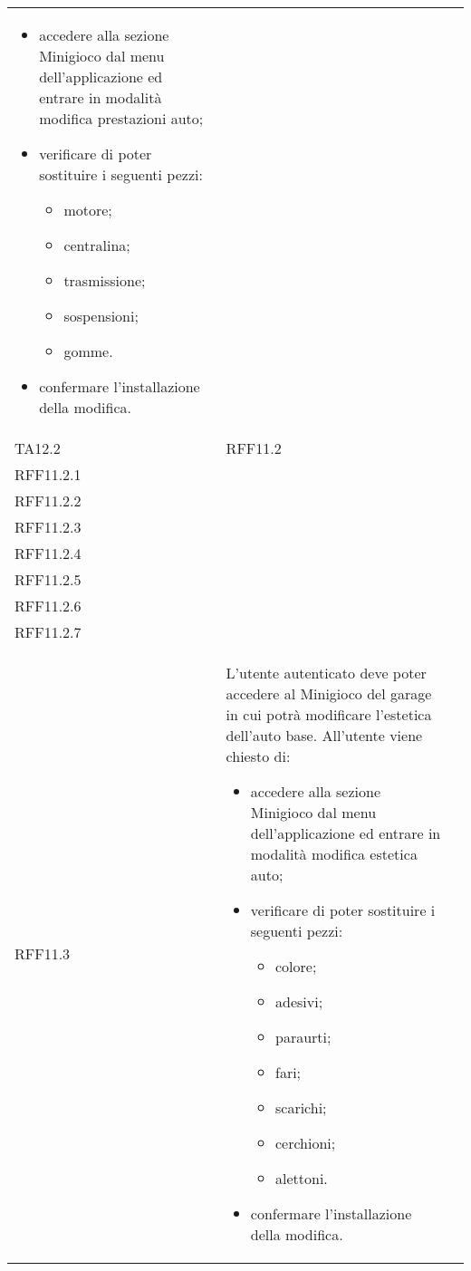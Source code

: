 \begin{longtable}{ >{\centering}p{} >{\centering}p{} >{\centering}p{}
			}
\begin{itemize}
		 	\item accedere alla sezione Minigioco dal menu dell'applicazione ed entrare in modalità modifica prestazioni auto;
		 	\item verificare di poter sostituire i seguenti pezzi:
		 		\begin{itemize}
		 			\item motore;
		 			\item centralina;
		 			\item trasmissione;
		 			\item sospensioni;
		 			\item gomme.
		 		\end{itemize}
		 	\item confermare l'installazione della modifica.
		 \end{itemize}		\tabularnewline
		 TA12.2	& RFF11.2\\ RFF11.2.1 \\ RFF11.2.2 \\ RFF11.2.3 \\ RFF11.2.4 \\ RFF11.2.5  \\ 	RFF11.2.6 \\ RFF11.2.7 \\RFF11.3 & L'utente autenticato deve poter accedere al Minigioco del garage in cui potrà modificare l'estetica dell'auto base. All'utente viene chiesto di:
		 \begin{itemize}
		 	\item accedere alla sezione Minigioco dal menu dell'applicazione ed entrare in modalità modifica estetica auto;
		 	\item verificare di poter sostituire i seguenti pezzi:
		 		\begin{itemize}
		 			\item colore;
		 			\item adesivi;
		 			\item paraurti;
		 			\item fari;
		 			\item scarichi;
		 			\item cerchioni;
		 			\item alettoni.
		 		\end{itemize}
		 	\item confermare l'installazione della modifica.
		 \end{itemize}	\tabularnewline
\end{longtable}
\newpage

